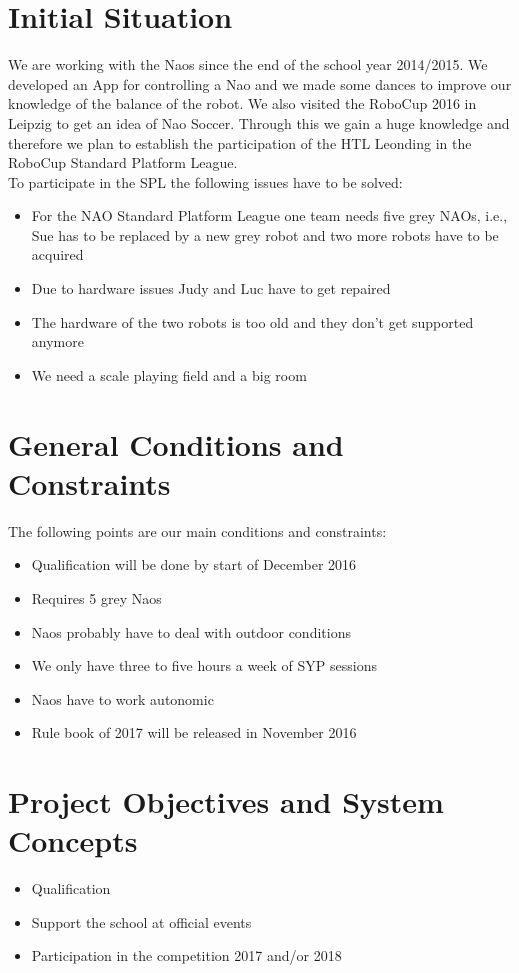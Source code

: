 \documentclass[12pt]{article}
\begin{document}
\section{Initial Situation}
We are working with the Naos since the end of the school year 2014/2015. We developed an App for controlling a Nao and we made some dances to improve our knowledge of the balance of the robot. We also visited the RoboCup 2016 in Leipzig to get an idea of Nao Soccer. 
Through this we gain a huge knowledge and therefore we plan to establish the participation of the HTL Leonding in the RoboCup Standard Platform League. \\
To participate in the SPL the following issues have to be solved:
\begin{itemize}
	\item For the NAO Standard Platform League one team needs five grey NAOs, i.e., Sue has to be replaced by a new grey robot and two more robots have to be acquired
	\item Due to hardware issues Judy and Luc have to get repaired
	\item The hardware of the two robots is too old and they don't get supported anymore
	\item We need a scale playing field and a big room
\end{itemize}

\pagebreak

\section{General Conditions and Constraints}
The following points are our main conditions and constraints:
\begin{itemize}
	\item Qualification will be done by start of December 2016
	\item Requires 5 grey Naos
	\item Naos probably have to deal with outdoor conditions
	\item We only have three to five hours a week of SYP sessions 
	\item Naos have to work autonomic
	\item Rule book of 2017 will be released in November 2016
\end{itemize}

\pagebreak

\section{Project Objectives and System Concepts}
\begin{itemize}
	\item Qualification
	\item Support the school at official events 
	\item Participation in the competition 2017 and/or 2018
\end{itemize}
\end{document}
